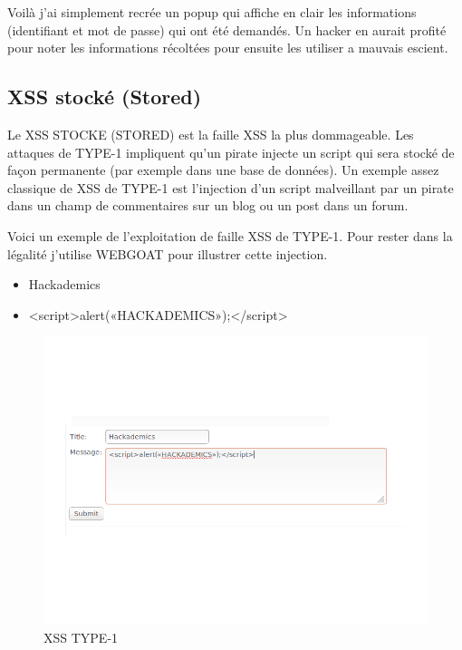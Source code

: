 \begin{flushleft}
Voilà j'ai simplement recrée un popup qui affiche en clair les informations (identifiant et mot de passe) qui ont été demandés. Un hacker en aurait profité pour noter les informations récoltées pour ensuite les utiliser a mauvais escient.
\end{flushleft}

\subsection{XSS stocké (Stored)}\label{vulnerabilites:web:xss:stored}

Le XSS STOCKE (STORED) est la faille XSS la plus dommageable. Les attaques de TYPE-1 impliquent qu'un pirate injecte un script qui sera stocké de façon permanente (par exemple dans une base de données). Un exemple assez classique de XSS de TYPE-1 est l'injection d'un script malveillant par un pirate dans un champ de commentaires sur un blog ou un post dans un forum.

\begin{flushleft}
Voici un exemple de l'exploitation de faille XSS de TYPE-1. Pour rester dans la légalité j'utilise WEBGOAT pour illustrer cette injection.
\end{flushleft}

\bigskip

\begin{itemize}
\item Hackademics
\item <script>alert(«HACKADEMICS»);</script>
\end{itemize}

\bigskip

\begin{figure}[hbtp]
\caption{XSS TYPE-1}
\centering
\includegraphics[scale=0.3]{Web/assets/xsst1-0.png}
\end{figure}

